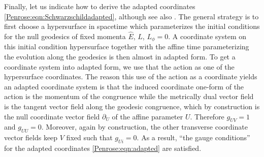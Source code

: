 Finally, let us indicate how to derive the adapted coordinates \eqref{Penrose:eqn:Schwarzschildadapted}, although see also \cite{blau2011plane}. The general strategy is to first choose a hypersurface in spacetime which parameterizes the initial conditions for the null geodesics of fixed momenta $\hat{E}$, $L$, $L_{\phi} = 0$. A coordinate system on this initial condition hypersurface together with the affine time parameterizing the evolution along the geodesics is then almost in adapted form. To get a coordinate system into adapted form, we use that the action as one of the hypersurface coordinates. The reason this use of the action as a coordinate yields an adapted coordinate system is that the induced coordinate one-form of the action is the momentum of the congruence while the metrically dual vector field is the tangent vector field along the geodesic congruence, which by construction is the null coordinate vector field $\partial_U$ of the affine parameter $U$. Therefore $g_{UV}  =  1$ and $g_{UU} = 0$. Moreover, again by construction, the other transverse coordinate vector fields keep $V$ fixed such that $g_{Ui} = 0$. As a result, ``the gauge conditions'' for the adapted coordinates \eqref{Penrose:eqn:adapted} are satisfied.

